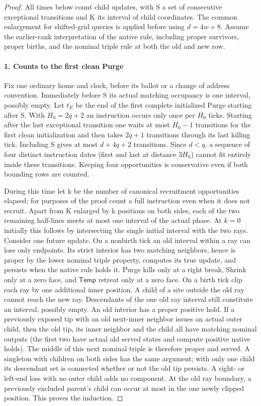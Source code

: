 \begin{proof}
All times below count child updates, with S a set of consecutive exceptional transitions and K its interval of child coordinates. The common enlargement for shifted-grid queries is applied before using \(d=4w+8\). Assume the earlier-rank interpretation of the native rule, including proper survivors, proper births, and the nominal triple rule at both the old and new row.

\paragraph{1. Counts to the first clean Purge}

Fix one ordinary home and clock, before its ballot or a change of address convention. Immediately before S its actual matching occupancy is one interval, possibly empty. Let \(t_E\) be the end of the first complete initialized Purge starting after S. With \(H_0=2q+2\) an instruction occurs only once per \(H_0\) ticks. Starting after the last exceptional transition one waits at most \(H_0- 1\) transitions for the first clean initialization and then takes \(2q+1\) transitions through its last killing tick. Including S gives at most \(d+4q+2\) transitions. Since \(d<q\), a sequence of four distinct instruction dates (first and last at distance \(3H_0\)) cannot fit entirely inside these transitions. Keeping four opportunities is conservative even if both bounding rows are counted.

During this time let k be the number of canonical recruitment opportunities elapsed; for purposes of the proof count a full instruction even when it does not recruit. Apart from K enlarged by k positions on both sides, each of the two remaining half-lines meets at most one interval of the actual phase. At \(k=0\) initially this follows by intersecting the single initial interval with the two rays. Consider one future update. On a nonbirth tick an old interval within a ray can lose only endpoints. Its strict interior has two matching neighbors, hence is proper by the lower nominal triple property, computes its true update, and persists when the native rule holds it. Purge kills only at a right break, Shrink only at a zero face, and \(\mathsf{Temp}\) retreat only at a zero face. On a birth tick clip each ray by one additional inner position. A child of a site outside the old ray cannot reach the new ray. Descendants of the one old ray interval still constitute an interval, possibly empty. An old interior has a proper positive hold. If a previously exposed tip with an old next-inner neighbor issues an actual outer child, then the old tip, its inner neighbor and the child all have matching nominal outputs (the first two have actual old served states and compute positive native holds). The middle of this next nominal triple is therefore proper and served. A singleton with children on both sides has the same argument; with only one child its descendant set is connected whether or not the old tip persists. A right- or left-end loss with no outer child adds no component. At the old ray boundary, a previously excluded parent's child can occur at most in the one newly clipped position. This proves the induction.


\end{proof}
